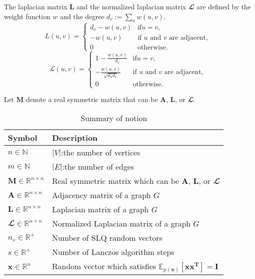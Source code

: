 \documentclass[senior,final,11pt]{iscs-thesis}
\begin{document}
The laplacian matrix ${\mathbf L}$ and the normalized laplacian matrix ${\mathbfcal L}$ are defined by the weight function $w$ and the degree $d_v:=\sum_{u} w(u,v)$.
\[
    L(u,v) = \begin{cases}
        d_v - w(u,v) & \text{if} u=v, \\
        - w(u,v) &  \text{if $u$ and $v$ are adjacent,} \\
        0   & \text{otherwise.}
        \end{cases}
\]
\[
    \mathcal{L}(u,v) = \begin{cases}
        1 - \frac{w(u,v)}{d_v} & \text{if} u=v, \\
        - \frac{w(u,v)}{\sqrt{d_u d_v}} &  \text{if $u$ and $v$ are adjacent,} \\
        0   & \text{otherwise.}
        \end{cases}
\]

Let ${\mathbf M}$ denote a real symmetric matrix that can be ${\mathbf A}$, ${\mathbf L}$, or ${\mathbfcal L}$.
\begin{table}[htb]
    \begin{center}
      \begin{tabular}{l l}
        \bf{Symbol} & \bf{Description} \\ \hline
        $n \in \mathbb{N}$ & $|V|$:the number of vertices \\
        $m \in \mathbb{N}$ & $|E|$:the number of edges \\ \hline
        ${\mathbf M} \in \mathbb{R}^{n\times n}$ & Real symmetric matrix which can be ${\mathbf A}$, ${\mathbf L}$, or ${\mathbfcal L}$\\
        ${\mathbf A} \in \mathbb{R}^{n\times n}$ & Adjacency matrix of a graph $G$ \\
        ${\mathbf L} \in \mathbb{R}^{n\times n}$ & Laplacian matrix of a graph $G$ \\
        ${\mathbfcal L} \in \mathbb{R}^{n\times n}$ & Normalized Laplacian matrix of a graph $G$ \\
        \hline
        $n_v \in \mathbb{R}^+$ & Number of SLQ random vectors \\
        $s \in \mathbb{R}^+$ & Number of Lanczos algorithm steps\\
        ${\mathbf x} \in \mathbb{R}^n$ & Random vector which satisfies $\mathbb{E}_{p(\mathbf{x})}[\mathbf{xx^T}] = \mathbf{I}$\\
        \hline
      \end{tabular}
      \caption{Summary of notion}
      \label{tab:notion}
    \end{center}
  \end{table}
\end{document}
